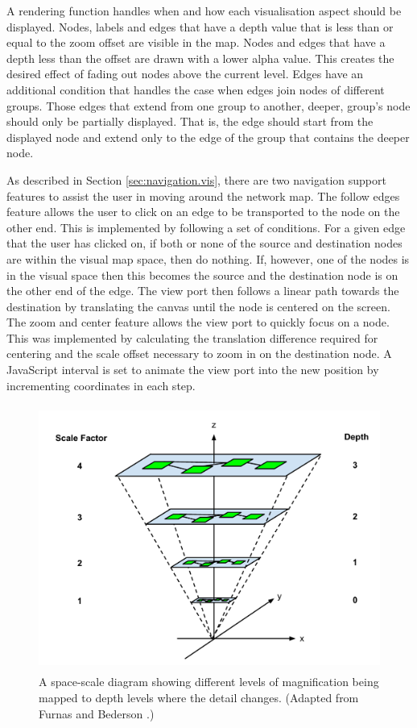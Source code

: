 \documentclass[11pt, a4paper]{article}
\begin{document}
A rendering function handles when and how each visualisation aspect should be
displayed. Nodes, labels and edges that have a depth value that is less than or
equal to the zoom offset are visible in the map. Nodes and edges that have a
depth less than the offset are drawn with a lower alpha value. This creates the
desired effect of fading out nodes above the current level. Edges have an
additional condition that handles the case when edges join nodes of different
groups. Those edges that extend from one group to another, deeper, group's node
should only be partially displayed. That is, the edge should start from the
displayed node and extend only to the edge of the group that contains the deeper
node.

As described in Section \ref{sec:navigation.vis}, there are two navigation
support features to assist the user in moving around the network map. The follow
edges feature allows the user to click on an edge to be transported to the node
on the other end. This is implemented by following a set of conditions. For a
given edge that the user has clicked on, if both or none of the source and
destination nodes are within the visual map space, then do nothing. If, however,
one of the nodes is in the visual space then this becomes the source and the
destination node is on the other end of the edge. The view port then follows a
linear path towards the destination by translating the canvas until the node is
centered on the screen. The zoom and center feature allows the view port to
quickly focus on a node. This was implemented by calculating the translation
difference required for centering and the scale offset necessary to zoom in on
the destination node. A JavaScript interval is set to animate the view port into
the new position by incrementing coordinates in each step.

\begin{figure} \centering
\includegraphics[width=120mm,height=87.2mm]{assets/nav2-0.pdf}
\caption{A space-scale diagram showing different levels of magnification being
mapped to depth levels where the detail changes. (Adapted from Furnas and
Bederson \cite{Furnas_1995}.) } 
\label{fig:nav2.0} 
\end{figure}
\end{document}
